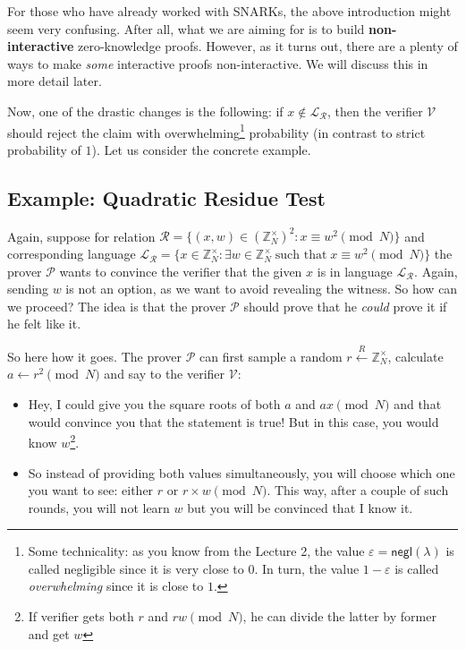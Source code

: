 \documentclass[../lecture-notes.tex]{subfiles}
\begin{document}
\begin{remark}
    For those who have already worked with SNARKs, the above introduction might seem very confusing. After all, what we are aiming for is to build \textbf{non-interactive} zero-knowledge proofs. However, as it turns out, there are a plenty of ways to make \textit{some} interactive proofs non-interactive. We will discuss this in more detail later.
\end{remark}

Now, one of the drastic changes is the following: if $x \not\in \mathcal{L}_{\mathcal{R}}$, then the verifier $\mathcal{V}$ should reject the claim with overwhelming\footnote{Some technicality: as you know from the Lecture 2, the value $\varepsilon = \mathsf{negl}(\lambda)$ is called negligible since it is very close to $0$. In turn, the value $1-\varepsilon$ is called \textit{overwhelming} since it is close to $1$.} probability (in contrast to strict probability of $1$). Let us consider the concrete example.

\subsection{Example: Quadratic Residue Test}\label{section:quadratic_residue_test}

Again, suppose for relation $\mathcal{R} = \{(x,w) \in (\mathbb{Z}_N^{\times})^2: x \equiv w^2 \pmod{N}\}$ and corresponding language $\mathcal{L}_{\mathcal{R}} = \{x \in \mathbb{Z}_N^{\times}: \exists w \in \mathbb{Z}_N^{\times} \; \text{such that} \; x \equiv w^2 \pmod{N}\}$ the prover $\mathcal{P}$ wants to convince the verifier that the given $x$ is in language $\mathcal{L}_{\mathcal{R}}$. Again, sending $w$ is not an option, as we want to avoid revealing the witness. So how can we proceed? The idea is that the prover $\mathcal{P}$ should prove that he \textit{could} prove it if he felt like it. 

So here how it goes. The prover $\mathcal{P}$ can first sample a random $r \xleftarrow{R} \mathbb{Z}_N^{\times}$, calculate $a \gets r^2 \pmod{N}$ and say to the verifier $\mathcal{V}$: 
\begin{itemize}
    \item Hey, I could give you the square roots of both $a$ and $ax \pmod{N}$ and that would convince you that the statement is true! But in this case, you would know $w$\footnote{If verifier gets both $r$ and $rw \pmod{N}$, he can divide the latter by former and get $w$}.
    \item So instead of providing both values simultaneously, you will choose which one you want to see: either $r$ or $r\times w\pmod{N}$. This way, after a couple of such rounds, you will not learn $w$ but you will be convinced that I know it.
\end{itemize}
\end{document}
